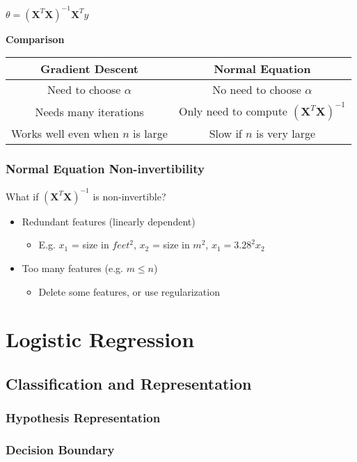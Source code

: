 \documentclass{article}
\newcommand{\vect}[1]{\boldsymbol{#1}}
\begin{document}
$\theta = (\vect{X}^T\vect{X})^{-1}\vect{X}^Ty$ \\


\begin{center}
\textbf{Comparison} \\
\begin{tabular}{ |c c | }
\hline
Gradient Descent & Normal Equation \\ 
\hline
Need to choose $\alpha$ & No need to choose $\alpha$ \\  
\hline
Needs many iterations & Only need to compute $(\vect{X}^T\vect{X})^{-1}$ \\
\hline
Works well even when $n$ is large & Slow if $n$ is very large \\
\hline
\end{tabular}
\end{center}

\subsubsection{Normal Equation Non-invertibility}
What if $(\vect{X}^T\vect{X})^{-1}$ is non-invertible?
\begin{itemize}
  \item Redundant features (linearly dependent)
  \begin{itemize}
    \item E.g. $x_1$ = size in $feet^2$, $x_2$ = size in $m^2$, $x_1 = 3.28^2 x_2$
  \end{itemize}
  \item Too many features (e.g. $m \le n$)
  \begin{itemize}
    \item Delete some features, or use regularization
  \end{itemize}
\end{itemize}

\section{Logistic Regression}
\subsection{Classification and Representation}
\subsubsection{Hypothesis Representation}
\subsubsection{Decision Boundary}
\end{document}
